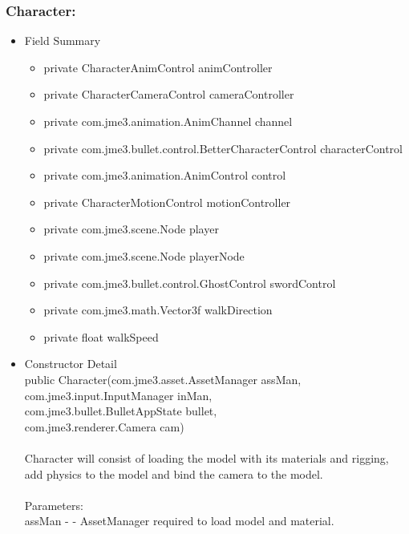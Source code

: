 \documentclass[letterpaper]{article}
\begin{document}
				\vspace{0.2in}
				\subsubsection*{Character:}
				\vspace{0.1in}
					\begin{itemize}
						\item	Field Summary
								\begin{itemize}
									\item	private CharacterAnimControl	animController 
									\item	private CharacterCameraControl	cameraController 
									\item	private com.jme3.animation.AnimChannel	channel 
									\item	private com.jme3.bullet.control.BetterCharacterControl	characterControl 
									\item	private com.jme3.animation.AnimControl	control 
									\item	private CharacterMotionControl	motionController 
									\item	private com.jme3.scene.Node	player 
									\item	private com.jme3.scene.Node	playerNode 
									\item	private com.jme3.bullet.control.GhostControl	swordControl 
									\item	private com.jme3.math.Vector3f	walkDirection 
									\item	private float	walkSpeed
								\end{itemize}
						\item	Constructor Detail \\
								public Character(com.jme3.asset.AssetManager assMan, \\
        com.jme3.input.InputManager inMan, \\
        com.jme3.bullet.BulletAppState bullet, \\
        com.jme3.renderer.Camera cam) \\ \\
								Character will consist of loading the model with its materials and rigging, add physics to the model and bind the camera to the model. \\ \\
								Parameters: \\
								assMan - - AssetManager required to load model and material. \\

\end{itemize}
\end{document}

